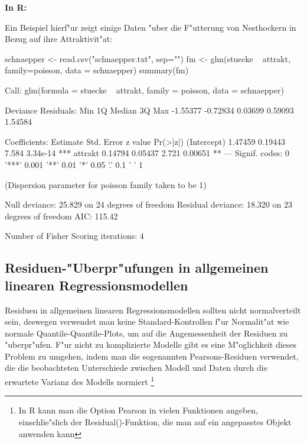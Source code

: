 \documentclass[a4paper,twoside]{tufte-book}\usepackage[]{graphicx}\usepackage[]{color}
\begin{document}
\vspace{1cm}
\begin{fullwidth}
\begin{mdframed}
    
\textbf{In R:} 

Ein Beispiel hierf"ur zeigt einige Daten "uber die F"utterung von Nesthockern in Bezug auf ihre Attraktivit"at:
\begin{Schunk}
\begin{Sinput}
schnaepper <- read.csv("schnaepper.txt", sep="")
fm <- glm(stuecke ~ attrakt, family=poisson, data = schnaepper)
summary(fm)
\end{Sinput}
\begin{Soutput}

Call:
glm(formula = stuecke ~ attrakt, family = poisson, data = schnaepper)

Deviance Residuals: 
     Min        1Q    Median        3Q       Max  
-1.55377  -0.72834   0.03699   0.59093   1.54584  

Coefficients:
            Estimate Std. Error z value Pr(>|z|)    
(Intercept)  1.47459    0.19443   7.584 3.34e-14 ***
attrakt      0.14794    0.05437   2.721  0.00651 ** 
---
Signif. codes:  0 '***' 0.001 '**' 0.01 '*' 0.05 '.' 0.1 ' ' 1

(Dispersion parameter for poisson family taken to be 1)

    Null deviance: 25.829  on 24  degrees of freedom
Residual deviance: 18.320  on 23  degrees of freedom
AIC: 115.42

Number of Fisher Scoring iterations: 4
\end{Soutput}
\end{Schunk}

\end{mdframed}
\end{fullwidth} 


\subsection{Residuen-"Uberpr"ufungen in allgemeinen linearen Regressionsmodellen}

Residuen in allgemeinen linearen Regressionsmodellen sollten nicht normalverteilt sein, deswegen verwendet man keine Standard-Kontrollen f"ur Normalit"at wie normale Quantile-Quantile-Plots, um auf die Angemessenheit der Residuen zu "uberpr"ufen. F"ur nicht zu komplizierte Modelle gibt es eine M"oglichkeit dieses Problem zu umgehen, indem man die sogenannten Pearsons-Residuen verwendet, die die beobachteten Unterschiede zwischen Modell und Daten durch die erwartete Varianz des Modells normiert \footnote{In R kann man die Option Pearson in vielen Funktionen angeben, einschlie"slich der Residual()-Funktion, die man auf ein angepasstes Objekt anwenden kann}
\end{document}
